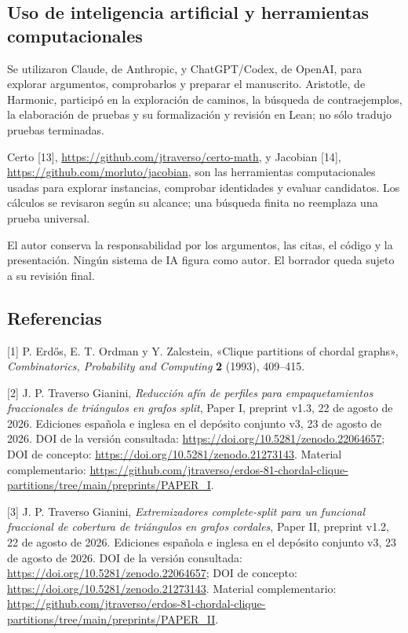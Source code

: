 \documentclass[spanish,11pt,a4paper]{article}
\begin{document}
\subsection{Uso de inteligencia artificial y herramientas computacionales}\label{uso-de-inteligencia-artificial-y-herramientas-computacionales}

Se utilizaron Claude, de Anthropic, y ChatGPT/Codex, de OpenAI, para explorar argumentos, comprobarlos y preparar el manuscrito. Aristotle, de Harmonic, participó en la exploración de caminos, la búsqueda de contraejemplos, la elaboración de pruebas y su formalización y revisión en Lean; no sólo tradujo pruebas terminadas.

Certo {[}13{]}, \url{https://github.com/jtraverso/certo-math}, y Jacobian {[}14{]}, \url{https://github.com/morluto/jacobian}, son las herramientas computacionales usadas para explorar instancias, comprobar identidades y evaluar candidatos. Los cálculos se revisaron según su alcance; una búsqueda finita no reemplaza una prueba universal.

El autor conserva la responsabilidad por los argumentos, las citas, el código y la presentación. Ningún sistema de IA figura como autor. El borrador queda sujeto a su revisión final.

\clearpage
\subsection{Referencias}
\begingroup\small\setlength{\parskip}{4pt}\label{referencias}

{[}1{]} P. Erdős, E. T. Ordman y Y. Zalcstein, «Clique partitions of chordal graphs», \emph{Combinatorics, Probability and Computing} \textbf{2} (1993), 409--415.

{[}2{]} J. P. Traverso Gianini, \emph{Reducción afín de perfiles para empaquetamientos fraccionales de triángulos en grafos split}, Paper I, preprint v1.3, 22 de agosto de 2026. Ediciones española e inglesa en el depósito conjunto v3, 23 de agosto de 2026. DOI de la versión consultada: \url{https://doi.org/10.5281/zenodo.22064657}; DOI de concepto: \url{https://doi.org/10.5281/zenodo.21273143}. Material complementario: \url{https://github.com/jtraverso/erdos-81-chordal-clique-partitions/tree/main/preprints/PAPER_I}.

{[}3{]} J. P. Traverso Gianini, \emph{Extremizadores complete-split para un funcional fraccional de cobertura de triángulos en grafos cordales}, Paper II, preprint v1.2, 22 de agosto de 2026. Ediciones española e inglesa en el depósito conjunto v3, 23 de agosto de 2026. DOI de la versión consultada: \url{https://doi.org/10.5281/zenodo.22064657}; DOI de concepto: \url{https://doi.org/10.5281/zenodo.21273143}. Material complementario: \url{https://github.com/jtraverso/erdos-81-chordal-clique-partitions/tree/main/preprints/PAPER_II}.
\end{document}
